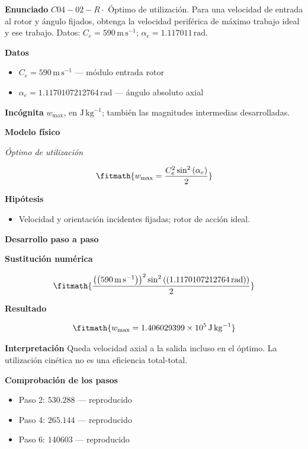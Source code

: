 \documentclass[10pt,openany]{book}
\begin{document}
\begin{tcolorbox}[title={Problema resuelto 2}, studiumworked, breakable]

\noindent\textbf{Enunciado}
\(C04-02-R \cdot\) Óptimo de utilización. Para una velocidad de entrada al rotor y ángulo fijados, obtenga la velocidad periférica de máximo trabajo ideal y ese trabajo. Datos: \(C_e=590\, \mathrm{m}\,\mathrm{s}^{-1}\); \(\alpha_e=1.117011\, \mathrm{rad}\).

\noindent\textbf{Datos}
\begin{itemize}
\item $C_e = 590\,\mathrm{m}\,\mathrm{s}^{-1}$ — módulo entrada rotor
\item $\alpha_e = 1.1170107212764\,\mathrm{rad}$ — ángulo absoluto axial
\end{itemize}

\noindent\textbf{Incógnita}
$w_{\max}$, en $\mathrm{J\,kg^{-1}}$; también las magnitudes intermedias desarrolladas.

\noindent\textbf{Modelo físico}

\noindent\textit{Óptimo de utilización}

\[
\fitmath{w_{\max}=\frac{C_e^{2} \sin^{2}{\left(\alpha_e \right)}}{2}}
\]

\noindent\textbf{Hipótesis}
\begin{itemize}
\item Velocidad y orientación incidentes fijadas; rotor de acción ideal.
\end{itemize}

\noindent\textbf{Desarrollo paso a paso}



\noindent\textbf{Sustitución numérica}

\[
\fitmath{\frac{\left(\left(590\,\mathrm{m}\,\mathrm{s}^{-1}\right)\right)^{2} \sin^{2}{\left(\left(1.1170107212764\,\mathrm{rad}\right) \right)}}{2}}
\]

\noindent\textbf{Resultado}

\[
\fitmath{w_{\max}=1.406029399\times10^{5}\,\mathrm{J}\,\mathrm{kg}^{-1}}
\]

\noindent\textbf{Interpretación}
Queda velocidad axial a la salida incluso en el óptimo. La utilización cinética no es una eficiencia total-total.

\noindent\textbf{Comprobación de los pasos}
\begin{itemize}
\item Paso 2: $530.288$ — reproducido
\item Paso 4: $265.144$ — reproducido
\item Paso 6: $140603$ — reproducido
\end{itemize}


\end{tcolorbox}
\end{document}
